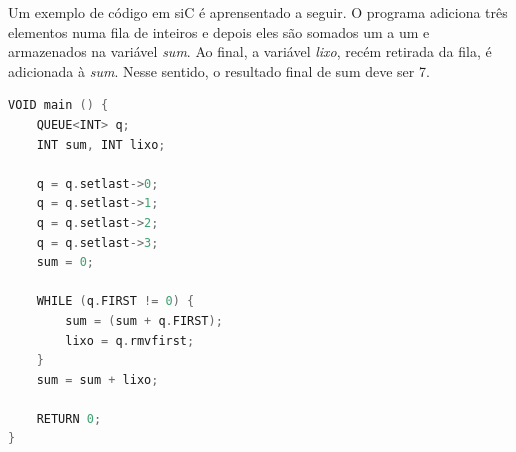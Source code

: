 \documentclass[12pt]{article}
\begin{document}
\indent Um exemplo de código em siC é aprensentado a seguir. O programa adiciona três elementos numa fila de inteiros e depois eles são somados um a um e armazenados na variável \textit{sum}. Ao final, a variável \textit{lixo}, recém retirada da fila, é adicionada à \textit{sum}. Nesse sentido, o resultado final de sum deve ser 7. \\

\begin{lstlisting}[language=C]
VOID main () {
    QUEUE<INT> q;
    INT sum, INT lixo;

    q = q.setlast->0;
    q = q.setlast->1;
    q = q.setlast->2;
    q = q.setlast->3;    
    sum = 0;
    
    WHILE (q.FIRST != 0) {    
        sum = (sum + q.FIRST);
        lixo = q.rmvfirst;
    }
    sum = sum + lixo;

    RETURN 0;
}

\end{lstlisting}



\end{document}
